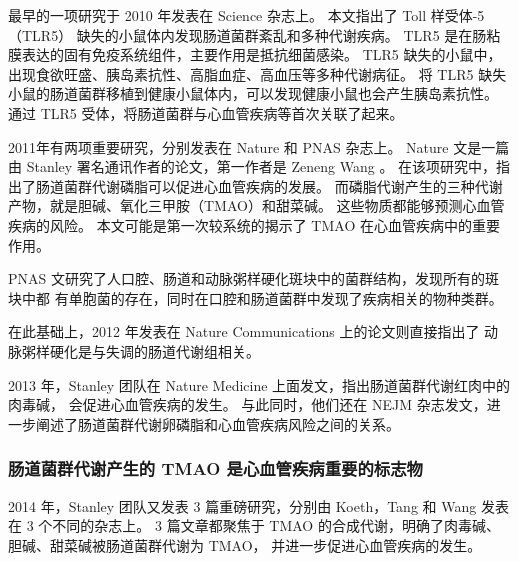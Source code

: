 \documentclass[]{ctexbook}
\begin{document}
最早的一项研究于 2010 年发表在 Science 杂志上\citep{vijay-kumarMetabolicSyndromeAltered2010}。
本文指出了 Toll 样受体-5（TLR5） 缺失的小鼠体内发现肠道菌群紊乱和多种代谢疾病。
TLR5 是在肠粘膜表达的固有免疫系统组件，主要作用是抵抗细菌感染。
TLR5 缺失的小鼠中，出现食欲旺盛、胰岛素抗性、高脂血症、高血压等多种代谢病征。
将 TLR5 缺失小鼠的肠道菌群移植到健康小鼠体内，可以发现健康小鼠也会产生胰岛素抗性。
通过 TLR5 受体，将肠道菌群与心血管疾病等首次关联了起来。

2011年有两项重要研究，分别发表在 Nature 和 PNAS 杂志上。
Nature 文是一篇由 Stanley 署名通讯作者的论文，第一作者是 Zeneng Wang \citep{wangGutFloraMetabolism2011}。
在该项研究中，指出了肠道菌群代谢磷脂可以促进心血管疾病的发展。
而磷脂代谢产生的三种代谢产物，就是胆碱、氧化三甲胺（TMAO）和甜菜碱。
这些物质都能够预测心血管疾病的风险。
本文可能是第一次较系统的揭示了 TMAO 在心血管疾病中的重要作用。

PNAS 文研究了人口腔、肠道和动脉粥样硬化斑块中的菌群结构，发现所有的斑块中都
有单胞菌的存在，同时在口腔和肠道菌群中发现了疾病相关的物种类群\citep{korenHumanOralGut2011}。

在此基础上，2012 年发表在 Nature Communications 上的论文则直接指出了
动脉粥样硬化是与失调的肠道代谢组相关\citep{karlssonSymptomaticAtherosclerosisAssociated2012}。

2013 年，Stanley 团队在 Nature Medicine 上面发文，指出肠道菌群代谢红肉中的肉毒碱，
会促进心血管疾病的发生\citep{koethIntestinalMicrobiotaMetabolism2013}。
与此同时，他们还在 NEJM 杂志发文，进一步阐述了肠道菌群代谢卵磷脂和心血管疾病风险之间的关系\citep{tangIntestinalMicrobialMetabolism2013b}。

\hypertarget{ux80a0ux9053ux83ccux7fa4ux4ee3ux8c22ux4ea7ux751fux7684-tmao-ux662fux5fc3ux8840ux7ba1ux75beux75c5ux91cdux8981ux7684ux6807ux5fd7ux7269}{%
\subsubsection{肠道菌群代谢产生的 TMAO 是心血管疾病重要的标志物}\label{ux80a0ux9053ux83ccux7fa4ux4ee3ux8c22ux4ea7ux751fux7684-tmao-ux662fux5fc3ux8840ux7ba1ux75beux75c5ux91cdux8981ux7684ux6807ux5fd7ux7269}}

2014 年，Stanley 团队又发表 3 篇重磅研究，分别由 Koeth，Tang 和 Wang 发表在 3 个不同的杂志上。
3 篇文章都聚焦于 TMAO 的合成代谢，明确了肉毒碱、胆碱、甜菜碱被肠道菌群代谢为 TMAO，
并进一步促进心血管疾病的发生\citep[\citet{tangPrognosticValueElevated2014}, \citet{wangPrognosticValueCholine2014}]{koethGButyrobetaineProatherogenicIntermediate2014}。
\end{document}
